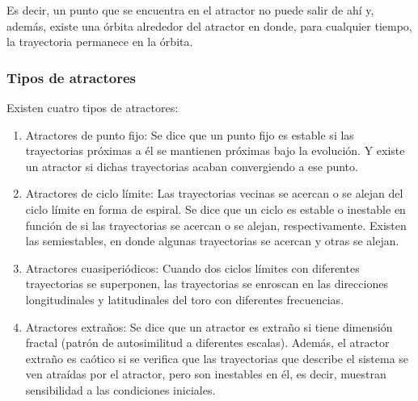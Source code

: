 Es decir, un punto que se encuentra en el atractor no puede salir de ahí y, además, existe una órbita alrededor del atractor en donde, para cualquier tiempo, la trayectoria permanece en la órbita.

\subsubsection{Tipos de atractores}

Existen cuatro tipos de atractores:

\begin{enumerate}
	
	\item Atractores de punto fijo: Se dice que un punto fijo es estable si las trayectorias próximas a él se mantienen próximas bajo la evolución. Y existe un atractor si dichas trayectorias acaban convergiendo a ese punto. 
	
	
	
	\item Atractores de ciclo límite: Las trayectorias vecinas se acercan o se alejan del ciclo límite en forma de espiral. Se dice que un ciclo es estable o inestable en función de si las trayectorias se acercan o se alejan, respectivamente. Existen las semiestables, en donde algunas trayectorias se acercan y otras se alejan.
	
	
	
	\item Atractores cuasiperiódicos: Cuando dos ciclos límites con diferentes trayectorias se superponen, las trayectorias se enroscan en las direcciones longitudinales y latitudinales del toro con diferentes frecuencias.
	
	
	
	\item Atractores extraños: Se dice que un atractor es extraño si tiene dimensión fractal (patrón de autosimilitud a diferentes escalas). Además, el atractor extraño es caótico si se verifica que las trayectorias que describe el sistema se ven atraídas por el atractor, pero son inestables en él, es decir, muestran sensibilidad a las condiciones iniciales.
	
\end{enumerate}


